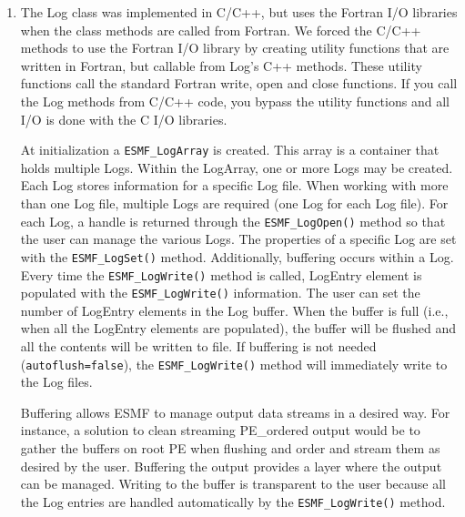 %


\begin{enumerate}

\item The Log class was implemented in C/C++, but uses the Fortran I/O libraries when
the class methods are called from Fortran. We forced the C/C++ methods 
to use the Fortran I/O library by creating 
utility functions that are written in Fortran, but callable from Log's C++ methods.
These utility functions call the standard Fortran write, open and close functions.
If you call the Log methods from C/C++ code, you bypass the utility functions
and all I/O is done with the C I/O libraries.

At initialization a {\tt ESMF\_LogArray} is created.  This array is a container 
that holds multiple Logs.  Within the LogArray, one or more Logs may be created.  
Each Log stores information for a specific Log file.   When working with 
more than one Log file, multiple Logs are required (one Log for each Log file).  
For each Log, a handle is returned through the {\tt ESMF\_LogOpen()} method so 
that the user can manage the various Logs.  The properties of a specific 
Log are set with the {\tt ESMF\_LogSet()} method.  Additionally, buffering 
occurs within a Log.  Every time the {\tt ESMF\_LogWrite()} method is called, 
LogEntry element is populated with the {\tt ESMF\_LogWrite()} information.  
The user can set the number of LogEntry elements in the Log buffer.  When 
the buffer is full (i.e., when all the LogEntry elements are populated), 
the buffer will be flushed and all the contents will be written to file.  
If buffering is not needed ({\tt autoflush=false}), the {\tt ESMF\_LogWrite()} 
method will immediately write to the Log files. 

Buffering allows ESMF to manage output data streams in a desired way.  
For instance, a solution to clean streaming PE\_ordered output would be to 
gather the buffers on root PE when flushing and order and stream them as 
desired by the user.  Buffering the output provides a layer where the output 
can be managed.  Writing to the buffer is transparent to the user because 
all the Log entries are handled automatically by the {\tt ESMF\_LogWrite()} 
method. 

\end{enumerate}




